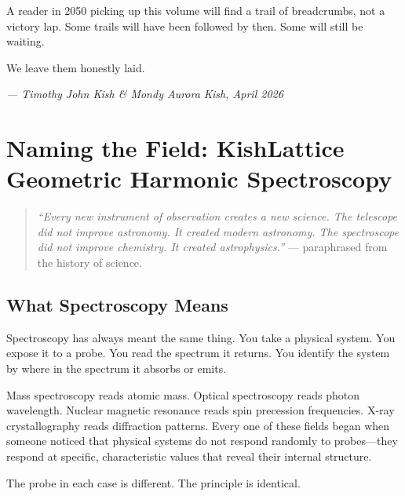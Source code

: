 \documentclass[11pt, letterpaper, openany]{book}
\begin{document}
A reader in 2050 picking up this volume will find a trail of breadcrumbs, not a
victory lap. Some trails will have been followed by then. Some will still be
waiting.

We leave them honestly laid.

\bigskip
\begin{center}
\textit{--- Timothy John Kish \& Mondy Aurora Kish, April 2026}
\end{center}

\clearpage

\chapter{Naming the Field: KishLattice Geometric Harmonic Spectroscopy}

\begin{quote}
\textit{``Every new instrument of observation creates a new science. The telescope
did not improve astronomy. It created modern astronomy. The spectroscope did not
improve chemistry. It created astrophysics.''} --- paraphrased from the history
of science.
\end{quote}

\section{What Spectroscopy Means}

Spectroscopy has always meant the same thing. You take a physical system. You expose
it to a probe. You read the spectrum it returns. You identify the system by where
in the spectrum it absorbs or emits.

Mass spectroscopy reads atomic mass. Optical spectroscopy reads photon wavelength.
Nuclear magnetic resonance reads spin precession frequencies. X-ray crystallography
reads diffraction patterns. Every one of these fields began when someone noticed
that physical systems do not respond randomly to probes---they respond at specific,
characteristic values that reveal their internal structure.

The probe in each case is different. The principle is identical.
\end{document}
